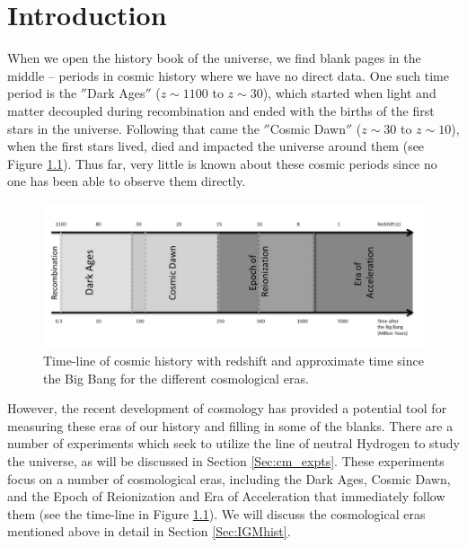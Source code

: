 \chapter{Introduction}\label{Ch:Intro}

When we open the history book of the universe, we find blank pages in the middle -- periods in cosmic history where we have no direct data. One such time period is the $''$Dark Ages$''$ ($z \sim 1100$ to $z \sim 30$), which started when light and matter decoupled during recombination and ended with the births of the first stars in the universe. Following that came the $''$Cosmic Dawn$''$ ($z\sim 30$ to $z\sim 10$), when the first stars lived, died and impacted the universe around them (see Figure \ref{Fig:hist}). Thus far, very little is known about these cosmic periods since no one has been able to observe them directly. 

\begin{figure}[htb]
\begin{center}
\includegraphics[width=0.95\linewidth]{Introduction/figures/timeline.jpg}
\caption{Time-line of cosmic history with redshift and approximate time since the Big Bang for the different cosmological eras. }
\label{Fig:hist}
\end{center}
\end{figure}

However, the recent development of \cm cosmology has provided a potential tool for measuring these eras of our history and filling in some of the blanks. There are a number of experiments which seek to utilize the \cm line of neutral Hydrogen to study the universe, as will be discussed in Section \ref{Sec:cm_expts}. These experiments focus on a number of cosmological eras, including the Dark Ages, Cosmic Dawn, and the Epoch of Reionization and Era of Acceleration that immediately follow them (see the time-line in Figure \ref{Fig:hist}). We will discuss the cosmological eras mentioned above in detail in Section \ref{Sec:IGMhist}.

